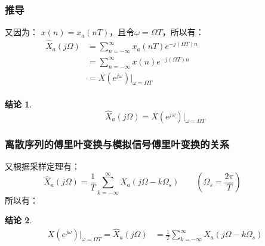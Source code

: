 \documentclass[notheorems,compress,mathserif,table]{beamer}
\newtheorem{jielun}{结论}
\begin{document}
\begin{frame}\frametitle{推导}%
又因为：  $x(n) = x_a(nT)$，且令$\omega = \Omega T$，所以有：
\begin{equation*}
\begin{split}
\hat{X}_a(j\Omega)  %
&=  \sum_{n=-\infty}^{\infty}x_a(nT)e^{-j(\Omega T) n} \qquad\qquad\qquad\qquad \\
&=  \sum_{n=-\infty}^{\infty}x(n)e^{-j(\Omega T) n} \\
&= X(e^{j\omega})|_{\omega = \Omega T } \\
\end{split}
\end{equation*}

\begin{jielun}
$$\hat{X}_a(j\Omega)  =
X(e^{j\omega})|_{\omega = \Omega T } $$
\end{jielun}

\end{frame}




\begin{frame}[shrink]\frametitle{离散序列的傅里叶变换与模拟信号傅里叶变换的关系}%
又根据采样定理有：
$$\hat{X}_a(j\Omega)   =  \frac{1}{T}\sum_{k=-\infty}^{\infty}X_a(j\Omega -k \Omega_s)\qquad (\Omega_s=\frac{2\pi}{T})
\qquad\quad  $$
所以有：

\begin{jielun}
\begin{equation*}
\begin{split}
X(e^{j\omega})\big|_{\omega = \Omega T }  =\hat{X}_a(j\Omega)  %
&= \frac{1}{T}\sum_{k=-\infty}^{\infty}X_a(j\Omega -k \Omega_s) \\
\end{split}
\end{equation*}

\end{jielun}



\end{frame}
\end{document}
